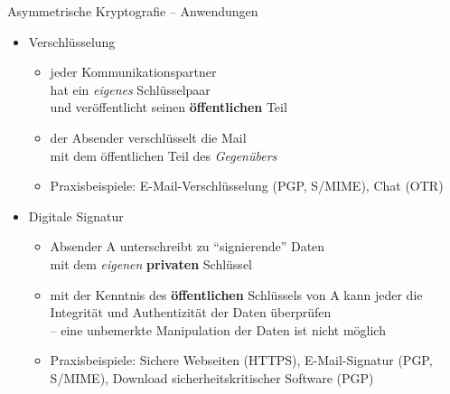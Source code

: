   \begin{frame}{Asymmetrische Kryptografie -- Anwendungen}
    \begin{itemize}
      \item Verschlüsselung
        \begin{itemize}
          \item jeder Kommunikationspartner\\hat ein \textit{eigenes} Schlüsselpaar\\und veröffentlicht seinen \textbf{öffentlichen} Teil
          \item der Absender verschlüsselt die Mail\\mit dem öffentlichen Teil des \textit{Gegenübers}
          \item Praxisbeispiele: E-Mail-Verschlüsselung (PGP, S/MIME), Chat (OTR)
        \end{itemize}
      \item Digitale Signatur
        \begin{itemize}
          \item Absender A unterschreibt zu ``signierende'' Daten\\mit dem \textit{eigenen} \textbf{privaten} Schlüssel
          \item mit der Kenntnis des \textbf{öffentlichen} Schlüssels von A kann jeder die Integrität und Authentizität der Daten überprüfen\\
            -- eine unbemerkte Manipulation der Daten ist nicht möglich
          \item Praxisbeispiele: Sichere Webseiten (HTTPS), E-Mail-Signatur (PGP, S/MIME), Download sicherheitskritischer Software (PGP)
        \end{itemize}
    \end{itemize}
  \end{frame}
